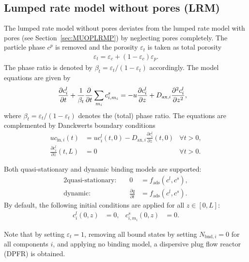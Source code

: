 \subsection{Lumped rate model without pores (LRM)}\label{sec:MUOPLRM}

The lumped rate model without pores  \cite{Guiochon2006,Felinger2004} deviates from the lumped rate model with pores (see Section~\ref{sec:MUOPLRMP}) by neglecting pores completely.
The particle phase $c^p$ is removed and the porosity $\varepsilon_t$ is taken as total porosity
\begin{align}
	\varepsilon_t = \varepsilon_c + \left( 1 - \varepsilon_c \right) \varepsilon_p. \label{eq:TotalPorosity}
\end{align}
The phase ratio is denoted by $\beta_t = \varepsilon_t / (1 - \varepsilon_t)$ accordingly.
The model equations are given by
\begin{align}
	\frac{\partial c^l_i}{\partial t} + \frac{1}{\beta_t} \frac{\mathop{}\!\mathrm{\partial}}{\mathop{}\!\mathrm{\partial} t} \sum_{m_i} c^s_{i,m_i} &= -u \frac{\partial c^l_i}{\partial z} + D_{\text{ax},i} \frac{\partial^2 c^l_i}{\partial z^2},
\end{align}
where $\beta_t = \varepsilon_t / (1 - \varepsilon_t)$ denotes the (total) phase ratio.
The equations are complemented by Danckwerts boundary conditions \cite{Danckwerts1953}
\begin{align*}
	u c_{\text{in},i}(t) &= u c^l_i(t,0) - D_{\text{ax},i} \frac{\partial c^l_i}{\partial z}(t, 0) & \forall t > 0,\\
	\frac{\partial c^l_i}{\partial z}(t, L) &= 0 & \forall t > 0.
\end{align*}

Both quasi-stationary and dynamic binding models are supported:
\begin{alignat*}{2}
	\text{quasi-stationary: }& & 0 &= f_{\text{ads}}\left( c^l, c^s\right), \\
	\text{dynamic: }& & \frac{\partial q}{\partial t} &= f_{\text{ads}}\left( c^l, c^s\right).
\end{alignat*}
By default, the following initial conditions are applied for all $z \in [0,L]$:
\begin{align}
	c^l_i(0, z) &= 0, & c^s_{i,m_i}(0,z) &= 0.
\end{align}

Note that by setting $\varepsilon_t = 1$, removing all bound states by setting $N_{\text{bnd},i} = 0$ for all components $i$, and applying no binding model, a dispersive plug flow reactor (DPFR) is obtained.


